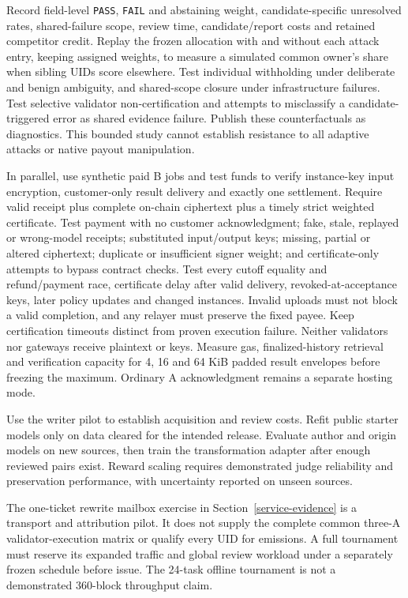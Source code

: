 Record field-level \texttt{PASS}, \texttt{FAIL} and abstaining weight,
candidate-specific unresolved rates, shared-failure scope, review time,
candidate/report costs and retained competitor credit. Replay the frozen
allocation with and without each attack entry, keeping assigned weights,
to measure a simulated common owner's share when sibling UIDs score
elsewhere. Test individual withholding under deliberate and benign
ambiguity, and shared-scope closure under infrastructure failures. Test
selective validator non-certification and attempts to misclassify a
candidate-triggered error as shared evidence failure. Publish these
counterfactuals as diagnostics. This bounded study cannot establish
resistance to all adaptive attacks or native payout manipulation.

In parallel, use synthetic paid B jobs and test funds to verify instance-key
input encryption, customer-only result delivery and exactly one settlement.
Require valid receipt plus complete on-chain ciphertext plus a timely strict
weighted certificate. Test payment with no customer acknowledgment; fake,
stale, replayed or wrong-model receipts; substituted input/output keys;
missing, partial or altered ciphertext; duplicate or insufficient signer
weight; and certificate-only attempts to bypass contract checks. Test every
cutoff equality and refund/payment race, certificate delay after valid
delivery, revoked-at-acceptance keys, later policy updates and changed
instances. Invalid uploads must not block a valid completion, and any
relayer must preserve the fixed payee. Keep certification timeouts distinct
from proven execution failure. Neither validators nor gateways receive
plaintext or keys. Measure gas, finalized-history retrieval and verification
capacity for 4, 16 and 64 KiB padded result envelopes before freezing the
maximum. Ordinary A acknowledgment remains a separate hosting mode.

Use the writer pilot to establish acquisition and review costs. Refit
public starter models only on data cleared for the intended release.
Evaluate author and origin models on new sources, then train the
transformation adapter after enough reviewed pairs exist. Reward scaling requires
demonstrated judge reliability and preservation performance, with
uncertainty reported on unseen sources.

The one-ticket rewrite mailbox exercise in Section~\ref{service-evidence} is a
transport and attribution pilot. It does not supply the complete common
three-A validator-execution matrix or qualify every UID for emissions. A full
tournament must reserve its expanded traffic and global review workload
under a separately frozen schedule before issue. The 24-task offline
tournament is not a demonstrated 360-block throughput claim.

